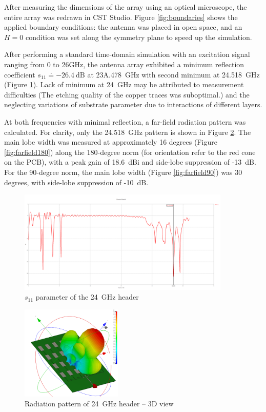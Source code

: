 After measuring the dimensions of the array using an optical microscope, the entire array was redrawn in CST Studio.
Figure \ref{fig:boundaries} shows the applied boundary conditions: the antenna was placed in open space, and an $H=0$ condition was set along the symmetry plane to speed up the simulation.

After performing a standard time-domain simulation with an excitation signal ranging from 0 to 26GHz, the antenna array exhibited a minimum reflection coefficient $s_{11} \doteq -26.4 \mathrm{~dB}$ at 23A.478~GHz with second minimum at 24.518~GHz (Figure \ref{fig:s11}).
Lack of minimum at 24~GHz may be attributed to measurement difficulties (The etching quality of the copper traces was suboptimal.) and the neglecting variations of substrate parameter due to interactions of different layers.

At both frequencies with minimal reflection, a far-field radiation pattern was calculated.
For clarity, only the 24.518~GHz pattern is shown in Figure \ref{fig:farfield3d}.
The main lobe width was measured at approximately 16 degrees (Figure \ref{fig:farfield180}) along the 180-degree norm (for orientation refer to the red cone on the PCB), with a peak gain of 18.6~dBi and side-lobe suppression of -13~dB.
For the 90-degree norm, the main lobe width (Figure \ref{fig:farfield90}) was 30 degrees, with side-lobe suppression of -10~dB.

\begin{figure}[h!]
  \centering
  \includegraphics[width=0.9\textwidth]{../img/s11.png}
  \caption[$s_{11}$ parameter of the 24~GHz header]{$s_{11}$ parameter of the 24~GHz header}
  \label{fig:s11}
\end{figure}


\begin{figure}[h!]
  \centering
  \includegraphics[width=0.43\textwidth]{../img/farfield3d.png}
  \caption[Radiation pattern of 24~GHz header -- 3D view]{Radiation pattern of 24~GHz header -- 3D view}
  \label{fig:farfield3d}
\end{figure}

